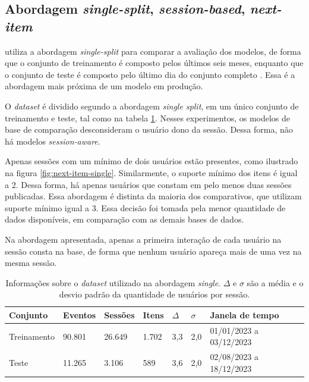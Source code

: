 \subsection{Abordagem \textit{single-split}, \textit{session-based}, \textit{next-item}}

\citet{HidasiKBT15} utiliza a abordagem \textit{single-split} para comparar a
avaliação dos modelos, de forma que o conjunto de treinamento é composto pelos
últimos seis meses, enquanto que o conjunto de teste é composto pelo último dia
do conjunto completo \cite{ludewig_2018}. Essa é a abordagem mais próxima de um
modelo em produção.

O \textit{dataset} é dividido segundo a abordagem \textit{single split}, em um
único conjunto de treinamento e teste, tal como na tabela
\ref{tab:split_data}. Nesses experimentos, os modelos de base de comparação
desconsideram o usuário dono da sessão. Dessa forma, não há modelos
\textit{session-aware}.

Apenas sessões com um mínimo de dois usuários estão presentes, como ilustrado na
figura \ref{fig:next-item-single}. Similarmente, o suporte mínimo dos itens é
igual a 2. Dessa forma, há apenas usuários que constam em pelo menos duas
sessões publicadas. Essa abordagem é distinta da maioria dos comparativos, que
utilizam suporte mínimo igual a 3. Essa decisão foi tomada pela menor quantidade
de dados disponíveis, em comparação com as demais bases de dados.


Na abordagem apresentada, apenas a primeira interação de cada usuário na
sessão consta na base, de forma que nenhum usuário apareça mais de uma vez na
mesma sessão.


  \begin{table}[htbp]
    \centering
    \begin{tabular}{|l|l|l|l|l|l|l|}
      \hline
      Conjunto & Eventos & Sessões & Itens & $\Delta$ & $\sigma$ & Janela de tempo \\ \hline 
         Treinamento & 90.801 & 26.649 & 1.702 & 3,3 & 2,0 & 01/01/2023 a 03/12/2023 \\ \hline
        Teste & 11.265 & 3.106 & 589 & 3,6 & 2,0 & 02/08/2023 a 18/12/2023 \\ \hline
    \end{tabular}
    \caption{Informações sobre o \textit{dataset} utilizado na abordagem
    \textit{single}. $\Delta$ e $\sigma$ são a média e o desvio padrão da quantidade de
    usuários por sessão.}
    \label{tab:split_data}
  \end{table}


